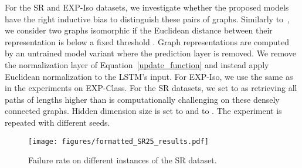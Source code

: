\documentclass{article}
\theoremstyle{plain}
\theoremstyle{definition}
\theoremstyle{remark}
\begin{document}
For the SR and EXP-Iso datasets, we investigate whether the proposed models have the right inductive bias to distinguish these pairs of graphs. 
Similarly to~\citet{bodnar2021weisfeiler2}, we consider two graphs isomorphic if the Euclidean distance between their representation is below a fixed threshold . 
Graph representations are computed by an untrained model variant where the prediction layer is removed. 
We remove the normalization layer of Equation~\eqref{update_function} and instead apply Euclidean normalization to the LSTM's input.
For EXP-Iso, we use the same  as in the experiments on EXP-Class.
For the SR datasets, we set  to  as retrieving all paths of lengths higher than  is computationally challenging on these densely connected graphs.  
Hidden dimension size is set to  and  to .
The experiment is repeated with  different seeds.


\begin{table}[t]
\centering
\caption{Test set classification accuracy (CSL, EXP-Class) and number of undistinguished pairs of graphs (EXP-Iso). Best results are highlighted in bold.}
\label{tab:exp_results}
\renewcommand{\arraystretch}{1.2}
\end{table}

\begin{figure}
\centering
    \texttt{[image: figures/formatted\_SR25\_results.pdf]}
    \vspace{-.5cm}
    \caption{Failure rate on different instances of the SR dataset.}
    \label{fig:sr}
\end{figure}
\end{document}
